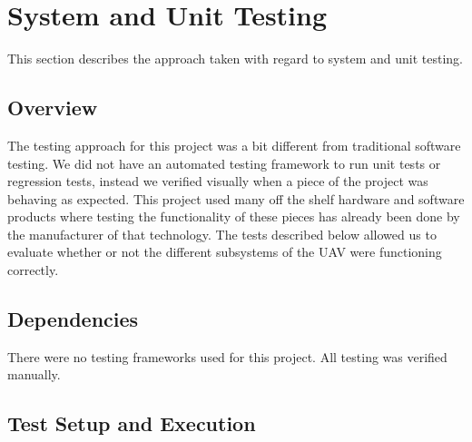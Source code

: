 
\chapter{System  and Unit Testing}

This section describes the approach taken with regard to system and unit testing. 

\section{Overview}
The testing approach for this project was a bit different from traditional software testing. We did not have an automated testing framework to run unit tests or regression tests, instead we verified visually when a piece of the project was behaving as expected. This project used many off the shelf hardware and software products where testing the functionality of these pieces has already been done by the manufacturer of that technology. The tests described below allowed us to evaluate whether or not the different subsystems of the UAV were functioning correctly.

\section{Dependencies}
There were no testing frameworks used for this project. All testing was verified manually.

\newpage
\section{Test Setup and Execution}
